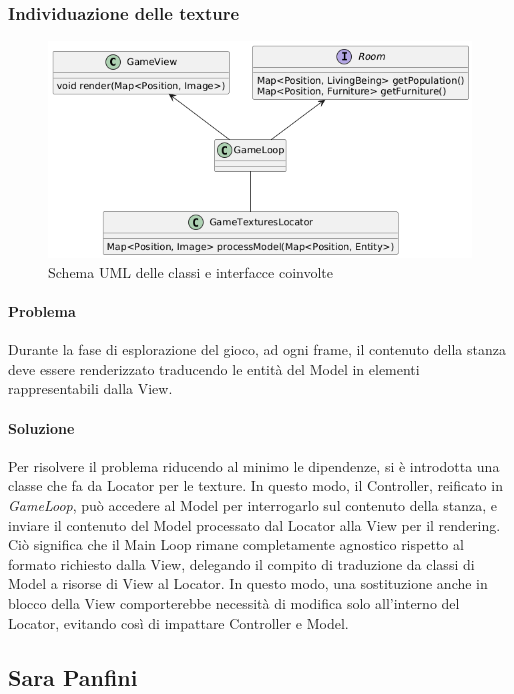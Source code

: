 \documentclass[a4paper,12pt]{report}
\begin{document}
\subsubsection{Individuazione delle texture}
\begin{figure}[H]
	\centering
	\includegraphics[width=\textwidth]{img/locator-game.png}
	\caption{Schema UML delle classi e interfacce coinvolte}
	\label{img:locator-game}
\end{figure}
\paragraph{Problema} Durante la fase di esplorazione del gioco, ad ogni frame, il contenuto della stanza deve essere renderizzato traducendo le entità del Model in elementi rappresentabili dalla View.
\paragraph{Soluzione} Per risolvere il problema riducendo al minimo le dipendenze, si è introdotta una classe che fa da Locator per le texture. In questo modo, il Controller, reificato in \textit{GameLoop}, può accedere al Model per interrogarlo sul contenuto della stanza, e inviare il contenuto del Model processato dal Locator alla View per il rendering. Ciò significa che il Main Loop rimane completamente agnostico rispetto al formato richiesto dalla View, delegando il compito di traduzione da classi di Model a risorse di View al Locator. In questo modo, una sostituzione anche in blocco della View comporterebbe necessità di modifica solo all'interno del Locator, evitando così di impattare Controller e Model.

\subsection{Sara Panfini}
\end{document}
